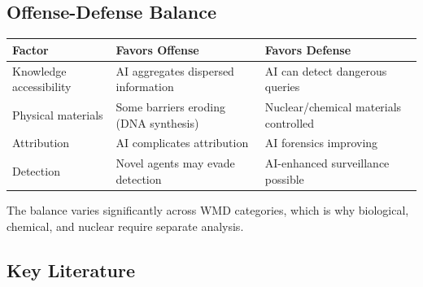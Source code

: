 \documentclass[11pt,letterpaper]{article}
\begin{document}
\subsection{Offense-Defense Balance}

\begin{center}
\small
\begin{tabular}{L{4cm}L{4cm}L{4cm}}
\toprule
\textbf{Factor} & \textbf{Favors Offense} & \textbf{Favors Defense} \\
\midrule
Knowledge accessibility & AI aggregates dispersed information & AI can detect dangerous queries \\
Physical materials & Some barriers eroding (DNA synthesis) & Nuclear/chemical materials controlled \\
Attribution & AI complicates attribution & AI forensics improving \\
Detection & Novel agents may evade detection & AI-enhanced surveillance possible \\
\bottomrule
\end{tabular}
\end{center}

The balance varies significantly across WMD categories, which is why biological, chemical, and nuclear require separate analysis.

\subsection{Key Literature}
\end{document}
